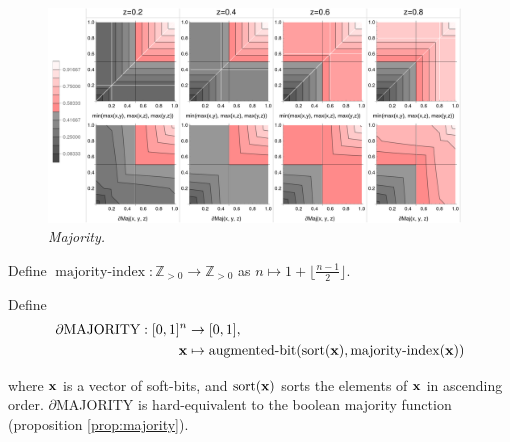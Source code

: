 \documentclass{article} %
\begin{document}
\begin{figure}[t]
	\centering
	\includegraphics[trim=0pt 0pt 0pt 0pt, clip, width=0.975\textwidth]{majority-gates.png}
	\caption{{\em Majority.}} 
	\label{fig:majority-plot}
\end{figure}


Define $\operatorname{majority-index}: \mathbb{Z}_{>0} \to \mathbb{Z}_{> 0}$ as $n \mapsto 1 + \lfloor \frac{n-1}{2}\rfloor$. 




Define
\begin{equation*}
\begin{aligned}
	\partial\text{MAJORITY}: [0,1]^{n} &\to [0,1], \\
	{\bf x} &\mapsto \operatorname{augmented-bit}(\operatorname{sort}({\bf x}), \operatorname{majority-index}({\bf x}))
\end{aligned}
\end{equation*}

where ${\bf x}$ is a vector of soft-bits, and $\operatorname{sort}({\bf x})$ sorts the elements of ${\bf x}$ in ascending order.
$\partial${MAJORITY} is hard-equivalent to the boolean majority function (proposition \ref{prop:majority}).
\end{document}
